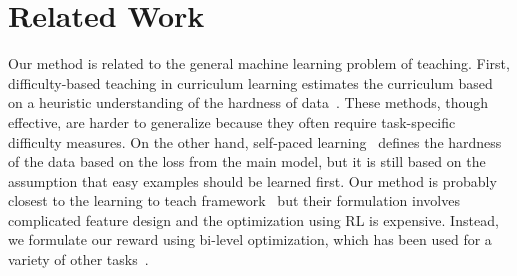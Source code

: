 \section{\label{sec:related_work}Related Work}
Our method is related to the general machine learning problem of teaching. First, difficulty-based teaching in curriculum learning estimates the curriculum based on a heuristic understanding of the hardness of data~\citep{cl_bengio,SpitkovskyAJ10,baysian_curriculum,zhang2016boosting,automate_cl_GravesBMMK17,zhang2018empirical,platanios19naacl}. These methods, though effective, are harder to generalize because they often require task-specific difficulty measures. On the other hand, self-paced learning~\citep{spl_kumar,spl_visual_category} defines the hardness of the data based on the loss from the main model, but it is still based on the assumption that easy examples should be learned first. Our method is probably closest to the learning to teach framework~\citep{learn_to_teach} but their formulation involves complicated feature design and the optimization using RL is expensive. Instead, we formulate our reward using bi-level optimization, which has been used for a variety of other tasks~\citep{bilevel_optim,hier_optim,darts,hyper_grad,learn_reweight}.

